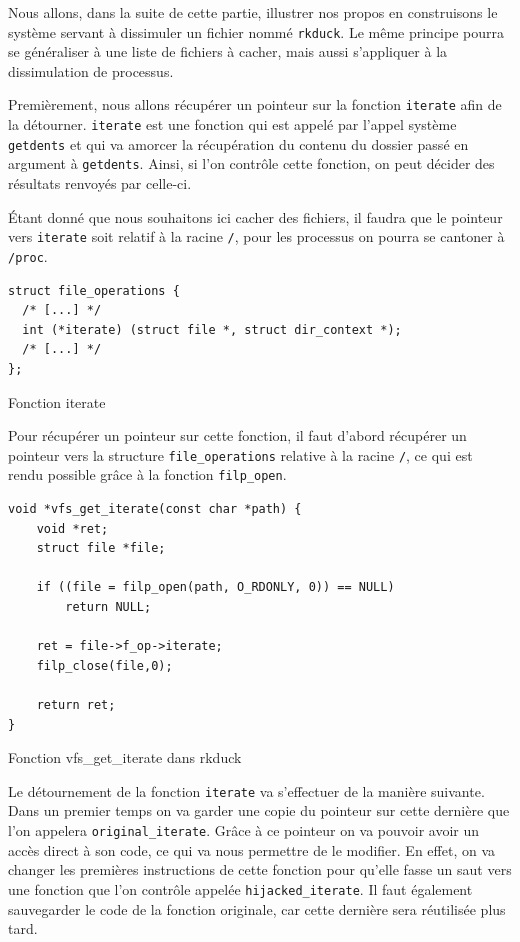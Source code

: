 \documentclass[11pt]{article}
\begin{document}
        Nous allons, dans la suite de cette partie, illustrer nos propos en construisons le système servant à dissimuler un fichier nommé \texttt{rkduck}. Le même principe pourra se généraliser à une liste de fichiers à cacher, mais aussi s'appliquer à la dissimulation de processus.

        Premièrement, nous allons récupérer un pointeur sur la fonction \texttt{iterate} afin de la détourner. \texttt{iterate} est une fonction qui est appelé par l'appel système \texttt{getdents} et qui va amorcer la récupération du contenu du dossier passé en argument à \texttt{getdents}. Ainsi, si l'on contrôle cette fonction, on peut décider des résultats renvoyés par celle-ci. 

        Étant donné que nous souhaitons ici cacher des fichiers, il faudra que le pointeur vers \texttt{iterate} soit relatif à la racine \texttt{/}, pour les processus on pourra se cantoner à \texttt{/proc}. \\

\begin{listing}[H]
\begin{verbatim}
struct file_operations {
  /* [...] */
  int (*iterate) (struct file *, struct dir_context *);
  /* [...] */
};
\end{verbatim}
\caption{Fonction iterate}
\label{listing:3}
\end{listing}

        Pour récupérer un pointeur sur cette fonction, il faut d'abord récupérer un pointeur vers la structure \texttt{file\_operations} relative à la racine \texttt{/}, ce qui est rendu possible grâce à la fonction \texttt{filp\_open}.\\

\begin{listing}[H]
\begin{verbatim}
void *vfs_get_iterate(const char *path) {
    void *ret;
    struct file *file;

    if ((file = filp_open(path, O_RDONLY, 0)) == NULL)
        return NULL;

    ret = file->f_op->iterate;
    filp_close(file,0);

    return ret;
}
\end{verbatim}
\caption{Fonction vfs\_get\_iterate dans rkduck}
\label{listing:3}
\end{listing}

        Le détournement de la fonction \texttt{iterate} va s'effectuer de la manière suivante. Dans un premier temps on va garder une copie du pointeur sur cette dernière que l'on appelera \texttt{original\_iterate}. Grâce à ce pointeur on va pouvoir avoir un accès direct à son code, ce qui va nous permettre de le modifier. En effet, on va changer les premières instructions de cette fonction pour qu'elle fasse un saut vers une fonction que l'on contrôle appelée \texttt{hijacked\_iterate}. Il faut également sauvegarder le code de la fonction originale, car cette dernière sera réutilisée plus tard. \\
\end{document}
